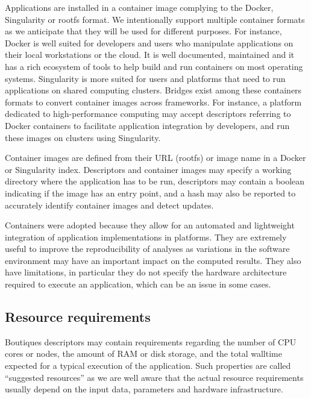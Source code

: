 \documentclass[a4paper,num-refs]{oup-contemporary}
\newcommand{\boutiques}{Boutiques\xspace}
\begin{document}
Applications are installed in a container image complying to the
Docker, Singularity or rootfs format. We intentionally support
multiple container formats as we anticipate that they will be used for
different purposes. For instance, Docker is well suited for developers
and users who manipulate applications on their local workstations or
the cloud. It is well documented, maintained and it has a rich
ecosystem of tools to help build and run containers on most operating
systems. Singularity is more suited for users and platforms that need
to run applications on shared computing clusters. Bridges exist among
these containers formats to convert container images across
frameworks. For instance, a platform dedicated to high-performance computing may accept
descriptors referring to Docker containers to facilitate application
integration by developers, and run these images on clusters using
Singularity.

Container images are defined from their URL (rootfs) or image name in
a Docker or Singularity index. Descriptors and container images may
specify a working directory where the application has to be run,
descriptors may contain a boolean indicating if the image has an entry
point, and a hash may also be reported to accurately identify
container images and detect updates.

Containers were adopted because they allow for an automated and
lightweight integration of application implementations in
platforms. They are extremely useful to improve the reproducibility of
analyses as variations in the software environment may have an
important impact on the computed results. They also have limitations,
in particular they do not specify the hardware architecture required
to execute an application, which can be an issue in some cases.


\subsection{Resource requirements}

\boutiques descriptors may contain requirements regarding the number
of CPU cores or nodes, the amount of RAM or disk storage, and the
total walltime expected for a typical execution of the
application. Such properties are called ``suggested resources'' as we
are well aware that the actual resource requirements usually depend on
the input data, parameters and hardware infrastructure.
\end{document}
